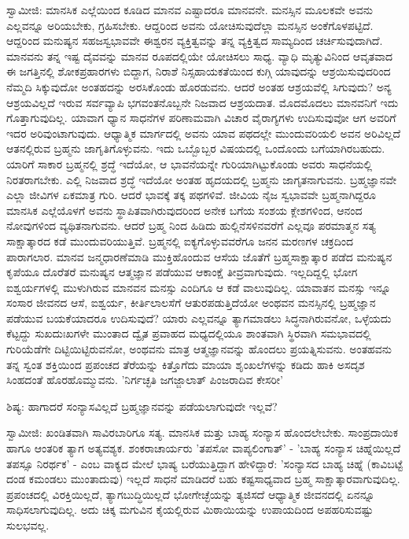 ಸ್ವಾಮೀಜಿ: ಮಾನಸಿಕ ಎಲ್ಲೆಯಿಂದ ಕೂಡಿದ ಮಾನವ ಎಷ್ಟಾದರೂ ಮಾನವನೇ. ಮನಸ್ಸಿನ ಮೂಲಕವೇ ಅವನು ಎಲ್ಲವನ್ನೂ ಅರಿಯಬೇಕು, ಗ್ರಹಿಸಬೇಕು. ಆದ್ದರಿಂದ ಅವನು ಯೋಚಿಸುವುದೆಲ್ಲಾ ಮನಸ್ಸಿನ ಅಂಕೆಗೊಳಪಟ್ಟಿದೆ. ಆದ್ದರಿಂದ ಮನುಷ್ಯನ ಸಹಜಸ್ವಭಾವವೇ ಈಶ್ವರನ ವ್ಯಕ್ತಿತ್ವವನ್ನು ತನ್ನ ವ್ಯಕ್ತಿತ್ವದ ಸಾಮ್ಯದಿಂದ ಚರ್ಚಿಸುವುದಾಗಿದೆ. ಮಾನವನು ತನ್ನ ಇಷ್ಟ ದೈವವನ್ನು ಮಾನವ ರೂಪದಲ್ಲಿಯೇ ಯೋಚಿಸಲು ಸಾಧ್ಯ. ವ್ಯಾಧಿ ಮೃತ್ಯುವಿನಿಂದ ಆವೃತವಾದ ಈ ಜಗತ್ತಿನಲ್ಲಿ ಶೋಕಪ್ರಹಾರಗಳು ಬಿದ್ದಾಗ, ನಿರಾಶೆ ನಿಸ್ಸಹಾಯಕತೆಯಿಂದ ಕುಗ್ಗಿ ಯಾವುದನ್ನು ಆಶ್ರಯಿಸುವುದರಿಂದ ನೆಮ್ಮದಿ ಸಿಕ್ಕುವುದೋ ಅಂತಹದನ್ನು ಅರಸಿಕೊಂಡು ಹೊರಡುವನು. ಆದರೆ ಅಂತಹ ಆಶ್ರಯವೆಲ್ಲಿ ಸಿಗುವುದು? ಅನ್ಯ ಆಶ್ರಯವಿಲ್ಲದೆ ಇರುವ ಸರ್ವವ್ಯಾಪಿ ಭಗವಂತನೊಬ್ಬನೇ ನಿಜವಾದ ಆಶ್ರಯದಾತ. ಮೊದಮೊದಲು ಮಾನವನಿಗೆ ಇದು ಗೊತ್ತಾಗುವುದಿಲ್ಲ. ಯಾವಾಗ ಧ್ಯಾನ ಸಾಧನೆಗಳ ಪರಿಣಾಮವಾಗಿ ವಿಚಾರ ವೈರಾಗ್ಯಗಳು ಉದಿಸುವುವೋ ಆಗ ಅವರಿಗೆ ಇದರ ಅರಿವುಂಟಾಗುವುದು. ಆಧ್ಯಾತ್ಮಿಕ ಮಾರ್ಗದಲ್ಲಿ ಅವನು ಯಾವ ಪಥದಲ್ಲೇ ಮುಂದುವರಿಯಲಿ ಅವನ ಅರಿವಿಲ್ಲದೆ ಆತನಲ್ಲಿರುವ ಬ್ರಹ್ಮನು ಜಾಗೃತಿಗೊಳ್ಳುವನು. ಇದು ಒಬ್ಬೊಬ್ಬರ ವಿಷಯದಲ್ಲಿ ಒಂದೊಂದು ಬಗೆಯಾಗಿರಬಹುದು. ಯಾರಿಗೆ ಸಾಕಾರ ಬ್ರಹ್ಮನಲ್ಲಿ ಶ್ರದ್ಧೆ ಇದೆಯೋ, ಆ ಭಾವನೆಯನ್ನೇ ಗುರಿಯಾಗಿಟ್ಟುಕೊಂಡು ಅವರು ಸಾಧನೆಯಲ್ಲಿ ನಿರತರಾಗಬೇಕು. ಎಲ್ಲಿ ನಿಜವಾದ ಶ್ರದ್ಧೆ ಇದೆಯೋ ಅಂತಹ ಹೃದಯದಲ್ಲಿ ಬ್ರಹ್ಮನು ಜಾಗೃತನಾಗುವನು. ಬ್ರಹ್ಮಜ್ಞಾನವೇ ಎಲ್ಲಾ ಜೀವಿಗಳ ಏಕಮಾತ್ರ ಗುರಿ. ಆದರೆ ಭಾವಕ್ಕೆ ತಕ್ಕ ಪಥಗಳಿವೆ. ಜೀವಿಯ ನೈಜ ಸ್ವಭಾವವೇ ಬ್ರಹ್ಮನಾಗಿದ್ದರೂ ಮಾನಸಿಕ ಎಲ್ಲೆಯೊಳಗೆ ಅವನು ಸ್ಥಾಪಿತವಾಗಿರುವುದರಿಂದ ಅನೇಕ ಬಗೆಯ ಸಂಶಯ ಕ್ಲೇಶಗಳಿಂದ, ಆನಂದ ನೋವುಗಳಿಂದ ವ್ಯಥಿತನಾಗುವನು. ಆದರೆ ಬ್ರಹ್ಮ ನಿಂದ ಹಿಡಿದು ಹುಲ್ಲಿನೆಸಳಿನವರೆಗೆ ಎಲ್ಲವೂ ಪರಮಾತ್ಮನ ಸತ್ಯ ಸಾಕ್ಷಾತ್ಕಾರದ ಕಡೆ ಮುಂದುವರಿಯುತ್ತಿವೆ. ಬ್ರಹ್ಮನಲ್ಲಿ ಐಕ್ಯಗೊಳ್ಳುವವರೆಗೂ ಜನನ ಮರಣಗಳ ಚಕ್ರದಿಂದ ಪಾರಾಗಲಾರ. ಮಾನವ ಜನ್ಮಧಾರಣೆಮಾಡಿ ಮುಕ್ತಿಹೊಂದುವ ಆಸೆಯ ಜೊತೆಗೆ ಬ್ರಹ್ಮಸಾಕ್ಷಾತ್ಕಾರ ಪಡೆದ ಮನುಷ್ಯನ ಕೃಪೆಯೂ ದೊರೆತರೆ ಮನುಷ್ಯನ ಆತ್ಮಜ್ಞಾನ ಪಡೆಯುವ ಆಕಾಂಕ್ಷೆ ತೀವ್ರವಾಗುವುದು. ಇಲ್ಲದಿದ್ದಲ್ಲಿ ಭೋಗ ಐಶ್ವರ್ಯಗಳಲ್ಲಿ ಮುಳುಗಿರುವ ಮಾನವನ ಮನಸ್ಸು ಎಂದಿಗೂ ಆ ಕಡೆ ವಾಲುವುದಿಲ್ಲ. ಯಾವಾತನ ಮನಸ್ಸು ಇನ್ನೂ ಸಂಸಾರ ಜೀವನದ ಆಸೆ, ಐಶ್ವರ್ಯ, ಕೀರ್ತಿಲಾಲಸೆಗೆ ಆತುರಪಡುತ್ತಿದೆಯೋ ಅಂಥವನ ಮನಸ್ಸಿನಲ್ಲಿ ಬ್ರಹ್ಮಜ್ಞಾನ ಪಡೆಯುವ ಬಯಕೆಯಾದರೂ ಉದಿಸುವುದೆ? ಯಾರು ಎಲ್ಲವನ್ನೂ ತ್ಯಾಗಮಾಡಲು ಸಿದ್ಧನಾಗಿರುವನೋ, ಒಳ್ಳೆಯದು ಕೆಟ್ಟದ್ದು ಸುಖದುಃಖಗಳೇ ಮುಂತಾದ ದ್ವೈತ ಪ್ರವಾಹದ ಮಧ್ಯದಲ್ಲಿಯೂ ಶಾಂತವಾಗಿ ಸ್ಥಿರವಾಗಿ ಸಮಭಾವದಲ್ಲಿ ಗುರಿಯೆಡೆಗೇ ದಿಟ್ಟಿಯಿಟ್ಟಿರುವನೋ, ಅಂಥವನು ಮಾತ್ರ ಆತ್ಮಜ್ಞಾನವನ್ನು ಹೊಂದಲು ಪ್ರಯತ್ನಿಸುವನು. ಅಂತಹವನು ತನ್ನ ಸ್ವಂತ ಶಕ್ತಿಯಿಂದ ಪ್ರಪಂಚದ ತೆರೆಯನ್ನು ಕಿತ್ತೊಗೆದು ಮಾಯಾ ಶೃಂಖಲೆಗಳನ್ನು ಕಡಿದು ಹಾಕಿ ಅಸದೃಶ ಸಿಂಹದಂತೆ ಹೊರಹೊಮ್ಮುವನು. 'ನಿರ್ಗಚ್ಛತಿ ಜಗಜ್ಜಾಲಾತ್ ಪಿಂಜರಾದಿವ ಕೇಸರೀ'

ಶಿಷ್ಯ: ಹಾಗಾದರೆ ಸಂನ್ಯಾಸವಿಲ್ಲದೆ ಬ್ರಹ್ಮಜ್ಞಾನವನ್ನು ಪಡೆಯಲಾಗುವುದೇ ಇಲ್ಲವೆ?

ಸ್ವಾಮೀಜಿ: ಖಂಡಿತವಾಗಿ ಸಾವಿರಬಾರಿಗೂ ಸತ್ಯ. ಮಾನಸಿಕ ಮತ್ತು ಬಾಹ್ಯ ಸಂನ್ಯಾಸ ಹೊಂದಲೇಬೇಕು. ಸಾಂಪ್ರದಾಯಿಕ ಹಾಗೂ ಆಂತರಿಕ ತ್ಯಾಗ ಅತ್ಯವಶ್ಯಕ. ಶಂಕರಾಚಾರ್ಯರು 'ತಪಸೋ ವಾಪ್ಯಲಿಂಗಾತ್' - 'ಬಾಹ್ಯ ಸಂನ್ಯಾಸ ಚಿಹ್ನೆಯಿಲ್ಲದೆ ತಪಸ್ಸೂ ನಿರರ್ಥಕ' - ಎಂಬ ವಾಕ್ಯದ ಮೇಲೆ ಭಾಷ್ಯ ಬರೆಯುತ್ತಿದ್ದಾಗ ಹೇಳಿದ್ದಾರೆ: 'ಸಂನ್ಯಾಸದ ಬಾಹ್ಯ ಚಿಹ್ನೆ (ಕಾವಿಬಟ್ಟೆ ದಂಡ ಕಮಂಡಲು ಮುಂತಾದುವು) ಇಲ್ಲದೆ ಸಾಧನೆ ಮಾಡಿದರೆ ಬಹು ಕಷ್ಟಸಾಧ್ಯವಾದ ಬ್ರಹ್ಮ ಸಾಕ್ಷಾತ್ಕಾರವಾಗುವುದಿಲ್ಲ. ಪ್ರಪಂಚದಲ್ಲಿ ವಿರಕ್ತಿಯಿಲ್ಲದೆ, ತ್ಯಾಗಬುದ್ಧಿಯಿಲ್ಲದೆ ಭೋಗೇಚ್ಛೆಯನ್ನು ತ್ಯಜಿಸದೆ ಆಧ್ಯಾತ್ಮಿಕ ಜೀವನದಲ್ಲಿ ಏನನ್ನೂ ಸಾಧಿಸಲಾಗುವುದಿಲ್ಲ. ಅದು ಚಿಕ್ಕ ಮಗುವಿನ ಕೈಯಲ್ಲಿರುವ ಮಿಠಾಯಿಯನ್ನು ಉಪಾಯದಿಂದ ಅಪಹರಿಸುವಷ್ಟು ಸುಲಭವಲ್ಲ.

